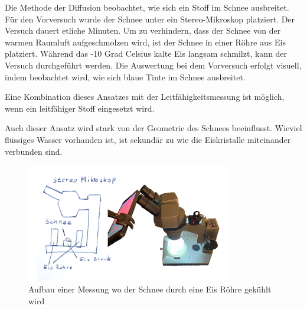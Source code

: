 Die Methode der Diffusion beobachtet, wie sich ein Stoff im Schnee ausbreitet. Für den Vorversuch wurde der Schnee unter ein Stereo-Mikroskop platziert. Der Versuch dauert etliche Minuten. Um zu verhindern, dass der Schnee von der warmen Raumluft aufgeschmolzen wird, ist der Schnee in einer Röhre aus Eis platziert. Während das -10 Grad Celsius kalte Eis langsam schmilzt, kann der Versuch durchgeführt werden. Die Auswertung bei dem Vorversuch erfolgt visuell, indem beobachtet wird, wie sich blaue Tinte im Schnee ausbreitet.

Eine Kombination dieses Ansatzes mit der Leitfähigkeitsmessung ist möglich, wenn ein leitfähiger Stoff eingesetzt wird.

Auch dieser Ansatz wird stark von der Geometrie des Schnees beeinflusst. Wieviel flüssiges Wasser vorhanden ist, ist sekundär zu wie die Eiskristalle miteinander verbunden sind.

\begin{figure}
    \centering
    \includegraphics[width=0.8\textwidth]{Bilder/freistellen.jpeg}
    \caption{Aufbau einer Messung wo der Schnee durch eine Eis Röhre gekühlt wird}
    \label{fig:AutMess}
\end{figure}
